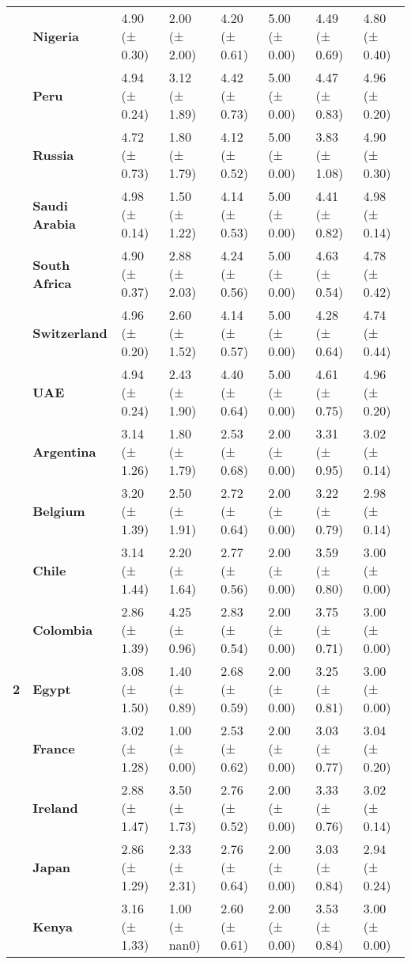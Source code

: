 \begin{longtable}{llllllll}
\textbf{} & \textbf{Nigeria} & 4.90 (± 0.30) & 2.00 (± 2.00) & 4.20 (± 0.61) & 5.00 (± 0.00) & 4.49 (± 0.69) & 4.80 (± 0.40) \\
\textbf{} & \textbf{Peru} & 4.94 (± 0.24) & 3.12 (± 1.89) & 4.42 (± 0.73) & 5.00 (± 0.00) & 4.47 (± 0.83) & 4.96 (± 0.20) \\
\textbf{} & \textbf{Russia} & 4.72 (± 0.73) & 1.80 (± 1.79) & 4.12 (± 0.52) & 5.00 (± 0.00) & 3.83 (± 1.08) & 4.90 (± 0.30) \\
\textbf{} & \textbf{Saudi Arabia} & 4.98 (± 0.14) & 1.50 (± 1.22) & 4.14 (± 0.53) & 5.00 (± 0.00) & 4.41 (± 0.82) & 4.98 (± 0.14) \\
\textbf{} & \textbf{South Africa} & 4.90 (± 0.37) & 2.88 (± 2.03) & 4.24 (± 0.56) & 5.00 (± 0.00) & 4.63 (± 0.54) & 4.78 (± 0.42) \\
\textbf{} & \textbf{Switzerland} & 4.96 (± 0.20) & 2.60 (± 1.52) & 4.14 (± 0.57) & 5.00 (± 0.00) & 4.28 (± 0.64) & 4.74 (± 0.44) \\
\textbf{} & \textbf{UAE} & 4.94 (± 0.24) & 2.43 (± 1.90) & 4.40 (± 0.64) & 5.00 (± 0.00) & 4.61 (± 0.75) & 4.96 (± 0.20) \\
\cline{1-8}
\multirow[t]{19}{*}{\textbf{2}} & \textbf{Argentina} & 3.14 (± 1.26) & 1.80 (± 1.79) & 2.53 (± 0.68) & 2.00 (± 0.00) & 3.31 (± 0.95) & 3.02 (± 0.14) \\
\textbf{} & \textbf{Belgium} & 3.20 (± 1.39) & 2.50 (± 1.91) & 2.72 (± 0.64) & 2.00 (± 0.00) & 3.22 (± 0.79) & 2.98 (± 0.14) \\
\textbf{} & \textbf{Chile} & 3.14 (± 1.44) & 2.20 (± 1.64) & 2.77 (± 0.56) & 2.00 (± 0.00) & 3.59 (± 0.80) & 3.00 (± 0.00) \\
\textbf{} & \textbf{Colombia} & 2.86 (± 1.39) & 4.25 (± 0.96) & 2.83 (± 0.54) & 2.00 (± 0.00) & 3.75 (± 0.71) & 3.00 (± 0.00) \\
\textbf{} & \textbf{Egypt} & 3.08 (± 1.50) & 1.40 (± 0.89) & 2.68 (± 0.59) & 2.00 (± 0.00) & 3.25 (± 0.81) & 3.00 (± 0.00) \\
\textbf{} & \textbf{France} & 3.02 (± 1.28) & 1.00 (± 0.00) & 2.53 (± 0.62) & 2.00 (± 0.00) & 3.03 (± 0.77) & 3.04 (± 0.20) \\
\textbf{} & \textbf{Ireland} & 2.88 (± 1.47) & 3.50 (± 1.73) & 2.76 (± 0.52) & 2.00 (± 0.00) & 3.33 (± 0.76) & 3.02 (± 0.14) \\
\textbf{} & \textbf{Japan} & 2.86 (± 1.29) & 2.33 (± 2.31) & 2.76 (± 0.64) & 2.00 (± 0.00) & 3.03 (± 0.84) & 2.94 (± 0.24) \\
\textbf{} & \textbf{Kenya} & 3.16 (± 1.33) & 1.00 (± nan0) & 2.60 (± 0.61) & 2.00 (± 0.00) & 3.53 (± 0.84) & 3.00 (± 0.00) \\

\end{longtable}
